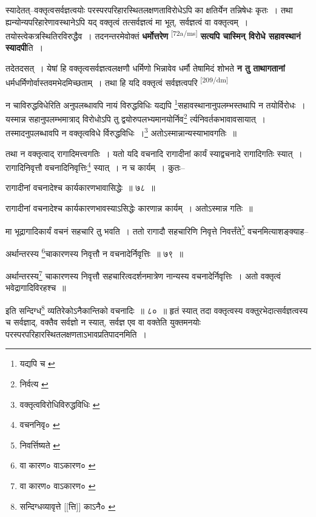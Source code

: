 \documentclass[article,12pt,a4paper]{memoir}
\begin{document}
	  \pstart स्यादेतत्--वक्तृत्वसर्वज्ञत्वयोः परस्परपरिहारस्थितलक्षणताविरोधेऽपि का क्षतिर्येन तन्निषेधः कृतः । तथा ह्यन्योन्यपरिहारेणावस्थानेऽपि यद् वक्तृत्वं तत्सर्वज्ञत्वं मा भूत्, सर्वज्ञत्वं वा वक्तृत्वम् । तयोस्त्वेकत्रस्थितिरविरुद्धैव । तदनन्तरमेवोक्तं \textbf{धर्मोत्तरेण} \leavevmode\textsuperscript{\rmlatinfont\tiny [72a/ms]} \textbf{सत्यपि चास्मिन् विरोधे सहावस्थानं स्यादपी}ति ।
	\pend
      

	  \pstart तदेतदसत् । येषां हि वक्तृत्वसर्वज्ञत्वलक्षणौ धर्मिणो भिन्नावेव धर्मौ तेषामिदं शोभते \textbf{न तु ताथागतानां} धर्मधर्मिणोर्वास्तवमभेदमिच्छताम् । तथा हि यदि वक्तृत्वं सर्वज्ञत्वपरि  \leavevmode\textsuperscript{\rmlatinfont\tiny [209/dm]} 
	  
	न चाविरुद्धविधेरिति अनुपलब्धावपि नायं विरुद्धविधिः यद्यपि \footnote{यद्यपि च \cite{dp-msA} \cite{dp-msB} \cite{dp-edP} \cite{dp-edH} \cite{dp-edE} \cite{dp-edN}}सहावस्थानानुपलम्भस्तथापि न तयोर्विरोधः । यस्मान्न सहानुपलम्भमात्राद् विरोधोऽपि तु द्वयोरुपलभ्यमानयोर्निव\footnote{निर्वत्य \cite{dp-msA}} र्त्यनिवर्तकभावावसायात् । तस्मादनुपलब्धावपि न वक्तृत्वविधे र्विरुद्धविधिः ।\footnote{वक्तृत्वविरोधिविरुद्धविधिः \cite{dp-msA} \cite{dp-msB} \cite{dp-edP} \cite{dp-edH} \cite{dp-edN}} अतोऽस्मान्नान्यस्याभावगतिः ॥ 
	  
	तथा न वक्तृत्वाद् रागादिमत्त्वगतिः । यतो यदि वचनादि रागादीनां कार्यं स्याद्वचनादे रागादिगतिः स्यात् । रागादिनिवृत्तौ वचनादिनिवृत्तिः\footnote{वचननिवृ० \cite{dp-msB} \cite{dp-msC} \cite{dp-msD}} स्यात् । न च कार्यम् । कुतः-- 
	  
	रागादीनां वचनादेश्च कार्यकारणभावासिद्धेः ॥ ७८ ॥ 
	  
	रागादीनां वचनादेश्च कार्यकारणभावस्याऽसिद्धेः कारणान्न कार्यम् । अतोऽस्मान्न गतिः ॥ 
	  
	मा भूद्रागादिकार्यं वचनं सहचारि तु भवति । ततो रागादौ सहचारिणि निवृत्ते निवर्त्तंते\footnote{निवर्त्तिष्यते \cite{dp-msC}} वचनमित्याशङ्क्याह-- 
	  
	अर्थान्तरस्य \footnote{वा कारण० \cite{dp-msA} \cite{dp-msB} \cite{dp-edP} \cite{dp-edH} \cite{dp-edE} वाऽकारण० \cite{dp-edN}}चाकारणस्य निवृत्तौ न वचनादेर्निवृत्तिः ॥ ७९ ॥ 
	  
	अर्थान्तरस्य\footnote{वा कारण० \cite{dp-msA} \cite{dp-msB} \cite{dp-edP} \cite{dp-edH} \cite{dp-edE} वाऽकारण० \cite{dp-edN}} चाकारणस्य निवृत्तौ सहचारित्वदर्शनमात्रेण नान्यस्य वचनादेर्निवृत्तिः । अतो वक्तृत्वं भवेद्रागादिविरहश्च ॥ 
	  
	इति सन्दिग्ध\footnote{सन्दिग्धव्यावृत्ते [[त्ति]] काऽनै० \cite{dp-msC}} व्यतिरेकोऽनैकान्तिको वचनादिः ॥ ८० ॥ हृतं स्यात् तदा वक्तृत्वस्य वक्तुरभेदात्सर्वज्ञत्वस्य च सर्वज्ञाद्, वक्तैव सर्वज्ञो न स्यात्, सर्वज्ञ एव वा वक्तेति युक्तमनयोः परस्परपरिहारस्थितलक्षणताऽभावप्रतिपादनमिति ।
	\pend
      
\end{document}
